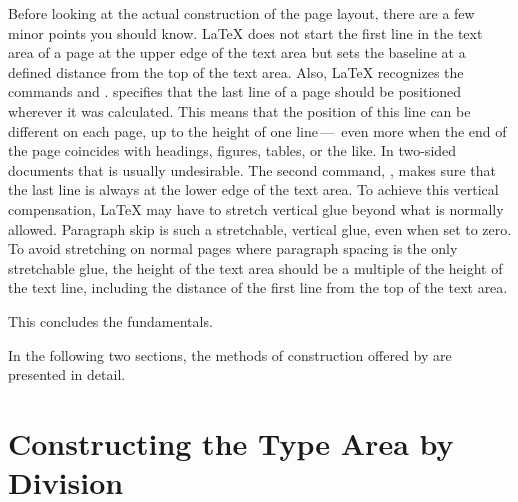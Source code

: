 \begin{Explain}
  Before looking at the actual construction of the page layout, there are a
  few minor points you should know. {\LaTeX} does not start the first line in
  the text area of a page at the upper edge of the text area but sets the
  baseline at a defined distance from the top of the text area. Also, {\LaTeX}
  recognizes the commands
   and
  .
   specifies that the last line of a page
  should be positioned wherever it was calculated. This means that the
  position of this line can be different on each page, up to the height of one
  line\,---\, even more when the end of the page coincides with headings,
  figures, tables, or the like. In two-sided documents that is usually
  undesirable. The second command, , makes
  sure that the last line is always at the lower edge of the text area. To
  achieve this vertical compensation, {\LaTeX} may have to stretch vertical
  glue beyond what is normally allowed. Paragraph skip is such a stretchable,
  vertical glue, even when set to zero.  To avoid stretching on normal pages
  where paragraph spacing is the only stretchable glue, the height of the text
  area should be a multiple of the height of the text line, including the
  distance of the first line from the top of the text area.

\iffalse%
  This explains all the basics of the type area calculation that play a role
  in {\KOMAScript}.
\else
  This concludes the fundamentals.
\fi
\iffalse%
  Below are two methods of construction offered by \KOMAScript{}.
\else 
\iffalse%
  Now, we can begin with the actual construction.
\else
  In the following two sections, the methods of construction offered by
  {\KOMAScript} are presented in detail.
\fi
\fi
\end{Explain}


\section{Constructing the Type Area by Division}

